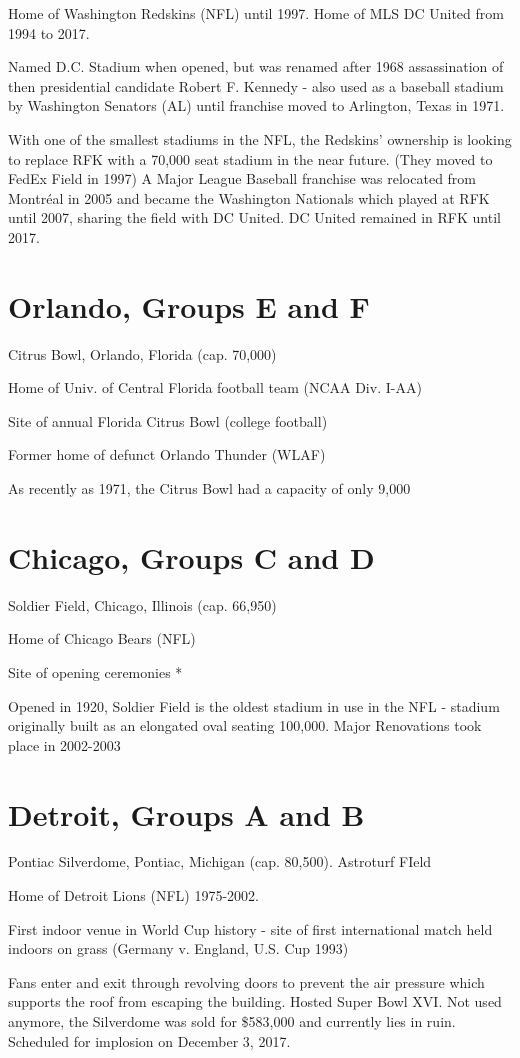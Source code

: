 Home of Washington Redskins (NFL) until 1997.  Home of MLS DC United from 1994 to 2017.

Named D.C. Stadium when opened, but was renamed after 1968 assassination of 
then presidential candidate Robert F. Kennedy - also used as a baseball stadium
by Washington Senators (AL) until franchise moved to Arlington, Texas in 1971.

With one of the smallest stadiums in the NFL, the Redskins' ownership is 
looking to replace RFK with a 70,000 seat stadium in the near future.  (They moved
to FedEx Field in 1997)  A Major League Baseball franchise was relocated from
Montr{\'e}al in 2005 and became the Washington Nationals which played at RFK until 2007,
sharing the field with DC United.  DC United remained in RFK until 2017.
\section{Orlando, Groups E and F}
Citrus Bowl, Orlando, Florida (cap. 70,000)

Home of Univ. of Central Florida football team (NCAA Div. I-AA)

Site of annual Florida Citrus Bowl (college football)

Former home of defunct Orlando Thunder (WLAF)

As recently as 1971, the Citrus Bowl had a capacity of only 9,000
\section{Chicago, Groups C and D}
Soldier Field, Chicago, Illinois (cap. 66,950)

Home of Chicago Bears (NFL)

Site of opening ceremonies *

Opened in 1920, Soldier Field is the oldest stadium in use in the NFL - stadium
originally built as an elongated oval seating 100,000.  Major Renovations took place 
in 2002-2003
\section{Detroit, Groups A and B}
Pontiac Silverdome, Pontiac, Michigan (cap. 80,500).  Astroturf FIeld

Home of Detroit Lions (NFL) 1975-2002.

First indoor venue in World Cup history - site of first international match 
held indoors on grass (Germany v. England, U.S. Cup 1993)

Fans enter and exit through revolving doors to prevent the air pressure which 
supports the roof from escaping the building.  Hosted Super Bowl XVI. Not used anymore, the Silverdome was sold for \$583,000 and
currently lies in ruin.  Scheduled for implosion on December 3, 2017.

